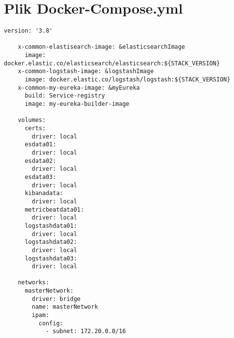 \chapter{Plik Docker-Compose.yml}
\label{dockerComposeRef}
\begin{lstlisting}[caption=Plik docker-comose.yml, label=dockerComposeFile]
    version: '3.8'
    
    x-common-elastisearch-image: &elasticsearchImage
      image: docker.elastic.co/elasticsearch/elasticsearch:${STACK_VERSION}
    x-common-logstash-image: &logstashImage
      image: docker.elastic.co/logstash/logstash:${STACK_VERSION}
    x-common-my-eureka-image: &myEureka
      build: Service-registry
      image: my-eureka-builder-image
    
    volumes:
      certs:
        driver: local
      esdata01:
        driver: local
      esdata02:
        driver: local
      esdata03:
        driver: local
      kibanadata:
        driver: local
      metricbeatdata01:
        driver: local
      logstashdata01:
        driver: local
      logstashdata02:
        driver: local
      logstashdata03:
        driver: local
    
    networks:
      masterNetwork:
        driver: bridge
        name: masterNetwork
        ipam:
          config:
            - subnet: 172.20.0.0/16
    

\end{lstlisting}
